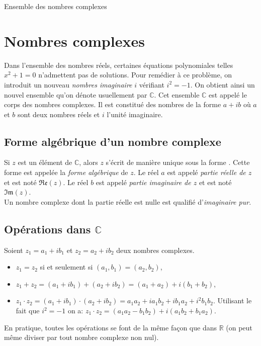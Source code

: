 
\TCDLessonStyleOn
\newcommand{\Reel}[1]{\mathfrak{Re}(#1)}
\newcommand{\Imag}[1]{\mathfrak{Im}(#1)}

\begin{chapter}{Ensemble des nombres complexes}
\section{Nombres complexes}
Dans l'ensemble des nombres r\'eels, certaines \'equations polynomiales telles $x^2 + 1 = 0$ n'admettent pas de solutions. 
Pour rem\'edier \`a ce probl\`eme, on introduit un nouveau \emph{nombres imaginaire} $i$ v\'erifiant $i^2 = -1$.
On obtient ainsi un nouvel ensemble qu'on d\'enote usuellement par $\mathbb{C}$. 
Cet ensemble $\mathbb{C}$ est appel\'e le corps des nombres complexes. 
Il est constitu\'e des nombres de la forme $a + i b$ o\`u $a$ et $b$ sont deux nombres r\'eels et $i$ l'unit\'e imaginaire.
%
\subsection{Forme alg\'ebrique d'un nombre complexe}
%
%
Si $z$ est un \'el\'ement de $\mathbb{C}$, alors $z$ s'\'ecrit de mani\`ere unique sous la forme .
Cette forme est appel\'ee la \emph{forme alg\'ebrique} de $z$.
Le r\'eel $a$ est appel\'e \emph{partie r\'eelle de $z$} et est not\'e $\Reel{z}$.
Le r\'eel $b$ est appel\'e \emph{partie imaginaire de $z$} et est not\'e $\Imag{z}$. \\
Un nombre complexe dont la partie r\'eelle est nulle est qualifi\'e d'\emph{imaginaire pur}.

\subsection{Op\'erations dans $\mathbb{C}$}
%
%
Soient $z_1 = a_1 + i b_1$ et $z_2 = a_2 + i b_2$ deux nombres complexes.
\begin{itemize}
\item $z_1 = z_2 $ si et seulement si $(a_1, b_1) = (a_2, b_2)$,
\item $z_1 + z_2 = (a_1 + i b_1) + (a_2 + i b_2) = (a_1 + a_2 ) + i (b_1 + b_2) $,
\item $z_1 \cdot z_2 = (a_1 + i b_1) \cdot (a_2 + i b_2) = a_1 a_2 + i a_1 b_2 + i b_1 a_2 + i^2 b_1 b_2$.
      Utilisant le fait que $i^2 = -1$ on a:
      $z_1 \cdot z_2 = (a_1 a_2 - b_1 b_2) + i (a_1 b_2 + b_1 a_2)$.
\end{itemize}
En pratique, toutes les op\'erations se font de la m\^eme fa\c{c}on que dans $\mathbb{R}$ (on peut m\^eme diviser par tout nombre complexe non nul).


\end{chapter}

